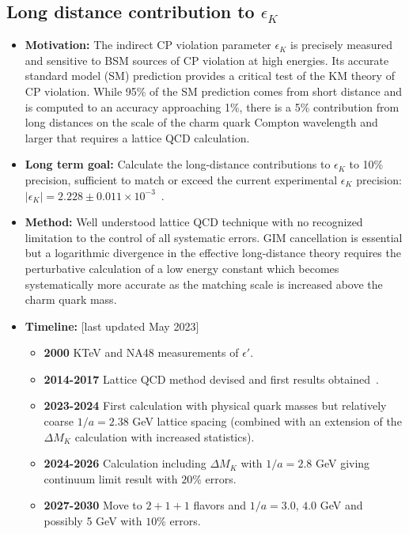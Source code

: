 \documentclass[12pt,hyperpdf]{article}
\begin{document}
\subsection{Long distance contribution to $\epsilon_K$}
\begin{itemize}
    \item{\bf Motivation:} The indirect CP violation parameter $\epsilon_K$ is precisely 
    measured and sensitive to BSM sources of CP violation at high energies. Its 
    accurate standard model (SM) prediction provides a critical test of the KM 
    theory of CP violation.  While 95\% of the SM prediction comes from short 
    distance and is computed to an accuracy approaching 1\%, there is a 5\% 
    contribution from long distances on the scale of the charm quark Compton 
    wavelength and larger that requires a lattice QCD calculation.
    \item{\bf Long term goal:} Calculate the long-distance contributions to $\epsilon_K$ 
    to 10\% precision, sufficient to match or exceed the current experimental 
    $\epsilon_K$ precision: $|\epsilon_K|=2.228\pm 0.011 \times 10^{-3}$~\cite{ParticleDataGroup:2022pth}.
    \item{\bf Method:} Well understood lattice QCD technique with no recognized 
    limitation to the control of all systematic errors. GIM cancellation is essential 
    but a logarithmic divergence in the effective long-distance theory requires the 
    perturbative calculation of a low energy constant which becomes systematically 
    more accurate as the matching scale is increased above the charm quark mass.
\item{\bf Timeline:} \hfill [last updated May 2023]
\begin{itemize}
    \item{\bf 2000} KTeV and NA48 measurements of $\epsilon'$.
    \item{\bf 2014-2017} Lattice QCD method devised and first results 
    obtained~\cite{Christ:2015phf}. 
    \item{\bf 2023-2024} First calculation with physical quark masses but relatively 
    coarse $1/a=2.38$ GeV lattice spacing (combined with an extension of the
    $\Delta M_K$ calculation with increased statistics).
    \item{\bf 2024-2026} Calculation including $\Delta M_K$ with $1/a = 2.8$ GeV 
    giving continuum limit result with $20$\% errors. 
    \item{\bf 2027-2030} Move to $2+1+1$ flavors and $1/a = 3.0$, $4.0$
    GeV and possibly 5 GeV with $10$\% errors. 
\end{itemize}
\end{itemize}
\end{document}

